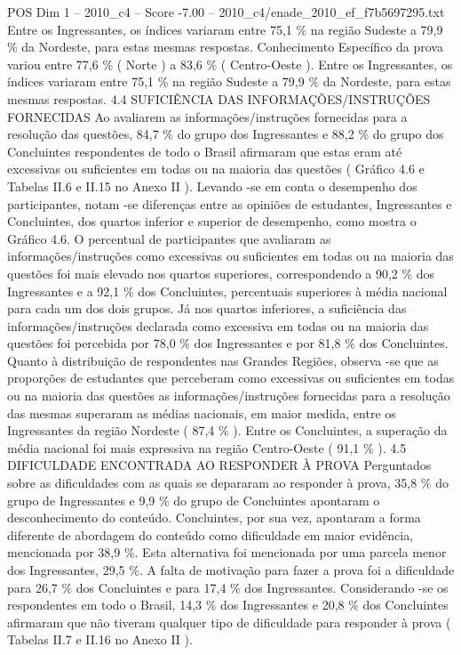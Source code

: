 \begin{textsample}{POS Dim 1 – 2010\_c4 – Score -7.00 – 2010\_c4/enade\_2010\_ef\_f7b5697295.txt}
Entre os Ingressantes, os índices variaram entre 75,1 \% na região Sudeste a 79,9 \% da Nordeste, para estas mesmas respostas.
Conhecimento Específico da prova variou entre 77,6 \% ( Norte ) a 83,6 \% ( Centro-Oeste ).
Entre os Ingressantes, os índices variaram entre 75,1 \% na região Sudeste a 79,9 \% da Nordeste, para estas mesmas respostas. 4.4 SUFICIÊNCIA DAS INFORMAÇÕES/INSTRUÇÕES FORNECIDAS Ao avaliarem as informações/instruções fornecidas para a resolução das questões, 84,7 \% do grupo dos Ingressantes e 88,2 \% do grupo dos Concluintes respondentes de todo o Brasil afirmaram que estas eram até excessivas ou suficientes em todas ou na maioria das questões ( Gráfico 4.6 e Tabelas II.6 e II.15 no Anexo II ).
Levando -se em conta o desempenho dos participantes, notam -se diferenças entre as opiniões de estudantes, Ingressantes e Concluintes, dos quartos inferior e superior de desempenho, como mostra o Gráfico 4.6.
O percentual de participantes que avaliaram as informações/instruções como excessivas ou suficientes em todas ou na maioria das questões foi mais elevado nos quartos superiores, correspondendo a 90,2 \% dos Ingressantes e a 92,1 \% dos Concluintes, percentuais superiores à média nacional para cada um dos dois grupos.
Já nos quartos inferiores, a suficiência das informações/instruções declarada como excessiva em todas ou na maioria das questões foi percebida por 78,0 \% dos Ingressantes e por 81,8 \% dos Concluintes.
Quanto à distribuição de respondentes nas Grandes Regiões, observa -se que as proporções de estudantes que perceberam como excessivas ou suficientes em todas ou na maioria das questões as informações/instruções fornecidas para a resolução das mesmas superaram as médias nacionais, em maior medida, entre os Ingressantes da região Nordeste ( 87,4 \% ).
Entre os Concluintes, a superação da média nacional foi mais expressiva na região Centro-Oeste ( 91,1 \% ). 4.5 DIFICULDADE ENCONTRADA AO RESPONDER À PROVA Perguntados sobre as dificuldades com as quais se depararam ao responder à prova, 35,8 \% do grupo de Ingressantes e 9,9 \% do grupo de Concluintes apontaram o desconhecimento do conteúdo.
Concluintes, por sua vez, apontaram a forma diferente de abordagem do conteúdo como dificuldade em maior evidência, mencionada por 38,9 \%.
Esta alternativa foi mencionada por uma parcela menor dos Ingressantes, 29,5 \%.
A falta de motivação para fazer a prova foi a dificuldade para 26,7 \% dos Concluintes e para 17,4 \% dos Ingressantes.
Considerando -se os respondentes em todo o Brasil, 14,3 \% dos Ingressantes e 20,8 \% dos Concluintes afirmaram que não tiveram qualquer tipo de dificuldade para responder à prova ( Tabelas II.7 e II.16 no Anexo II ).

\end{textsample}
